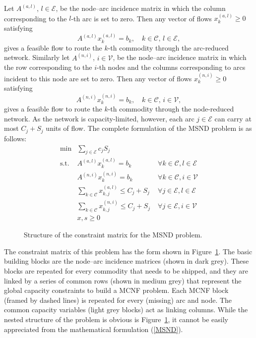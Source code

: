 \documentclass[10pt,a4paper]{report}
\begin{document}
Let $A^{(a,l)}$, $l\in\mathcal{E}$, be the node--arc incidence matrix in
which the column corresponding to the $l$-th arc is set to zero. Then any
vector of flows $x_k^{(a,l)}\ge 0$ satisfying
\[
A^{(a,l)} x_k^{(a,l)} = b_k,\quad k \in\mathcal{C},\, l\in\mathcal{E},
\]
gives a feasible flow to route the $k$-th commodity through the
arc-reduced network. Similarly let $A^{(n,i)}$, $i\in\mathcal{V}$, be the node--arc incidence matrix in
which the row corresponding to the $i$-th nodes and the columns
corresponding to arcs incident to this node are set to zero. Then any
vector of flows $x_k^{(n,i)}\ge 0$ satisfying
\[
A^{(n,i)} x_k^{(n,i)} = b_k,\quad k \in\mathcal{C},\, i\in\mathcal{V},
\]
gives a feasible flow to route the $k$-th commodity through the
node-reduced network. 
As the network is capacity-limited, however,
each arc $j\in\mathcal{E}$ can carry at most
$C_j + S_j$ units of flow. 
The complete formulation of the MSND problem is as follows:
\begin{equation}
\begin{array}{rll}
\min & \displaystyle \sum_{j \in \mathcal{E}} c_j S_j\\
\text{s.t.} & A^{(a,l)} x_k^{(a,l)} = b_k
                  & \;\forall k\in\mathcal{C},l\in\mathcal{E}\\
            & A^{(n,i)} x_k^{(n,i)} = b_k
                  & \;\forall k\in\mathcal{C},i\in\mathcal{V}\\
            & \displaystyle \sum_{k\in\mathcal{C}} x_{k,j}^{(a,l)} \le C_j + S_j 
                   & \;\forall j\in\mathcal{E}, l\in \mathcal{E}\\
            & \displaystyle \sum_{k\in\mathcal{C}} x_{k,j}^{(n,i)} \le C_j + S_j 
                   & \;\forall j\in\mathcal{E}, i\in \mathcal{V}\\
            & x, s \ge 0
\end{array}\label{MSND}
\end{equation}

\begin{figure}[ht]
\begin{center}
\end{center}
\caption{Structure of the constraint matrix for the MSND problem.}
\label{MSND_struct}

\end{figure}
%

The constraint matrix of this problem has the form shown in Figure~\ref{MSND_struct}.
The basic building blocks are the node--arc incidence matrices (shown in dark grey).
These blocks are repeated for every commodity that
needs to be shipped, and they are linked by a series of common rows
(shown in medium grey)
that represent the global capacity constraints to build a MCNF
problem. Each MCNF block (framed by dashed lines) is repeated for every (missing) arc
and node. The common capacity variables (light grey blocks) act as linking
columns. 
While the nested structure of the problem is obvious is
Figure~\ref{MSND_struct}, it cannot be easily appreciated from the mathematical
formulation (\ref{MSND}).
\end{document}
